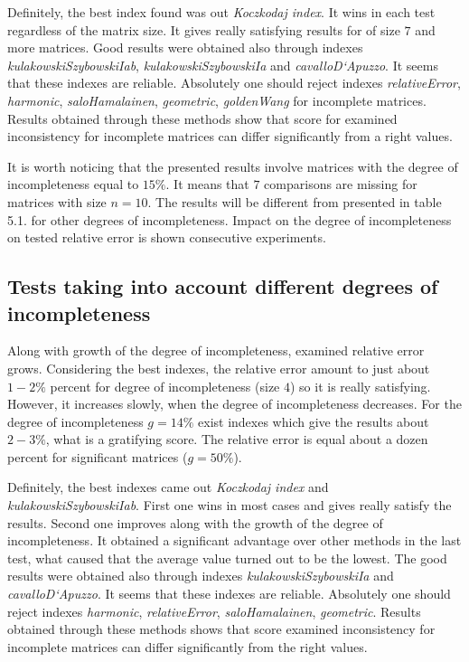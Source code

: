 Definitely, the best index found was out \textit{Koczkodaj index}. It wins in each test regardless of the matrix size. It gives really satisfying results for of size $7$ and more matrices. Good results were obtained also through indexes \textit{kulakowskiSzybowskiIab}, \textit{kulakowskiSzybowskiIa} and \textit{cavalloD`Apuzzo}. It seems that these indexes are reliable. Absolutely one should reject indexes \textit{relativeError}, \textit{harmonic}, \textit{saloHamalainen}, \textit{geometric}, \textit{goldenWang} for incomplete matrices. Results obtained through these methods show that score for examined inconsistency for incomplete matrices can differ significantly from a right values.

It is worth noticing that the presented results involve matrices with the degree of incompleteness equal to $15\%$. It means that $7$ comparisons are missing for matrices with size $n = 10$. The results will be different from presented in table 5.1. for other degrees of incompleteness. Impact on the degree of incompleteness on tested relative error is shown consecutive experiments.

\subsection{Tests taking into account different degrees of incompleteness}
Along with growth of the degree of incompleteness, examined relative error grows. Considering the best indexes, the relative error amount to just about $1 - 2\%$ percent for degree of incompleteness (size $4$) so it is really satisfying. However, it increases slowly, when the degree of incompleteness decreases. For the degree of incompleteness $g=14\%$ exist indexes which give the results about $2 - 3 \%$, what is a gratifying score. The relative error is equal about a dozen percent for significant matrices ($g=50\%$).

Definitely, the best indexes came out \textit{Koczkodaj index} and \textit{kulakowskiSzybowskiIab}. First one wins in most cases and gives really satisfy the results. Second one improves along with the growth of the degree of incompleteness. It obtained a significant advantage over other methods in the last test, what caused that the average value turned out to be the lowest. 
The good results were obtained also through indexes \textit{kulakowskiSzybowskiIa} and \textit{cavalloD`Apuzzo}. It seems that these indexes are reliable. Absolutely one should reject indexes \textit{harmonic}, \textit{relativeError}, \textit{saloHamalainen}, \textit{geometric}. Results obtained through these methods shows that score examined inconsistency for incomplete matrices can differ significantly from the right values.

